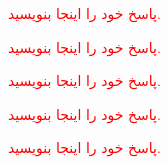 \documentclass[12pt, answers]{exam}
\begin{document}
\begin{questions}


    
    \begin{solution}
        \textcolor{red}{پاسخ خود را اینجا بنویسید.}
    \end{solution}

    \pagebreak


    
    \begin{solution}
        \textcolor{red}{پاسخ خود را اینجا بنویسید.}
    \end{solution}

    \pagebreak

  


    

    \begin{solution}
        \textcolor{red}{پاسخ خود را اینجا بنویسید.}
    \end{solution}

    \pagebreak


    

    \begin{solution}
        \textcolor{red}{پاسخ خود را اینجا بنویسید.}
    \end{solution}

    \pagebreak


    

    \begin{solution}
        \textcolor{red}{پاسخ خود را اینجا بنویسید.}
    \end{solution}
\end{questions}
\end{document}
